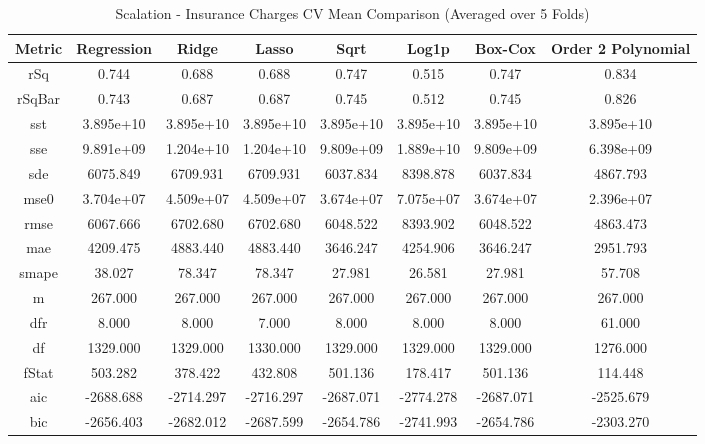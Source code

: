 \documentclass{article}
\begin{document}
\begin{table}[H]
\centering
\caption{Scalation - Insurance Charges CV Mean Comparison (Averaged over 5 Folds)}
\label{tab:Scalation - Insurance Charges CV Mean Comparison}
\begin{tabular}{|c|c|c|c|c|c|c|c|} \hline
Metric & Regression & Ridge & Lasso & Sqrt & Log1p &  Box-Cox & Order 2 Polynomial \\\hline \hline
rSq & 0.744 & 0.688 & 0.688 & 0.747 & 0.515 & 0.747 & 0.834 \\\hline
rSqBar & 0.743 & 0.687 & 0.687 & 0.745 & 0.512 & 0.745 & 0.826 \\\hline
sst & 3.895e+10 & 3.895e+10 & 3.895e+10 & 3.895e+10 & 3.895e+10 & 3.895e+10 & 3.895e+10 \\\hline
sse & 9.891e+09 & 1.204e+10 & 1.204e+10 & 9.809e+09 & 1.889e+10 & 9.809e+09 & 6.398e+09 \\\hline
sde & 6075.849 & 6709.931 & 6709.931 & 6037.834 & 8398.878 & 6037.834 & 4867.793 \\\hline
mse0 & 3.704e+07 & 4.509e+07 & 4.509e+07 & 3.674e+07 & 7.075e+07 & 3.674e+07 & 2.396e+07 \\\hline
rmse & 6067.666 & 6702.680 & 6702.680 & 6048.522 & 8393.902 & 6048.522 & 4863.473 \\\hline
mae & 4209.475 & 4883.440 & 4883.440 & 3646.247 & 4254.906 & 3646.247 & 2951.793 \\\hline
smape & 38.027 & 78.347 & 78.347 & 27.981 & 26.581 & 27.981 & 57.708 \\\hline
m & 267.000 & 267.000 & 267.000 & 267.000 & 267.000 & 267.000 & 267.000 \\\hline
dfr & 8.000 & 8.000 & 7.000 & 8.000 & 8.000 & 8.000 & 61.000 \\\hline
df & 1329.000 & 1329.000 & 1330.000 & 1329.000 & 1329.000 & 1329.000 & 1276.000 \\\hline
fStat & 503.282 & 378.422 & 432.808 & 501.136 & 178.417 & 501.136 & 114.448 \\\hline
aic & -2688.688 & -2714.297 & -2716.297 & -2687.071 & -2774.278 & -2687.071 & -2525.679 \\\hline
bic & -2656.403 & -2682.012 & -2687.599 & -2654.786 & -2741.993 & -2654.786 & -2303.270 \\\hline
\end{tabular}
\end{table}
\end{document}
